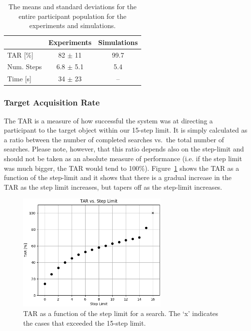 \documentclass[a4paper, twoside]{article}
\begin{document}
\begin{table}[b]                      
  \centering                       
  \caption{The means and standard deviations for the entire participant population for the experiments and simulations.}\label{tab:results-summary}
  \begin{tabular}{lcc}
    \toprule
     & Experiments & Simulations \\ \midrule
    TAR [\%] & 82 $\pm$ 11 & 99.7 \\ \midrule
    Num. Steps & 6.8 $\pm$ 5.1 & 5.4 \\ \midrule
    Time [s] & 34 $\pm$ 23 & --  \\ \midrule
    \bottomrule
  \end{tabular}
\end{table}

\subsubsection{Target Acquisition Rate}

\noindent The TAR is a measure of how successful the system was at directing a participant to the target object within our 15-step limit. It is simply calculated as a ratio between the number of completed searches vs.\ the total number of searches. Please note, however, that this ratio depends also on the step-limit and should not be taken as an absolute measure of performance (i.e. if the step limit was much bigger, the TAR would tend to 100\%). Figure~\ref{fig:tar-steps} shows the TAR as a function of the step-limit and it shows that there is a gradual increase in the TAR as the step limit increases, but tapers off as the step-limit increases.

\begin{figure}[b]
  \centering
  \includegraphics[height=5.9cm]{../figures/cdf_tar_limit.png}
  \caption{TAR as a function of the step limit for a search. The `x' indicates the cases that exceeded the 15-step limit. }\label{fig:tar-steps}
\end{figure}
\end{document}
